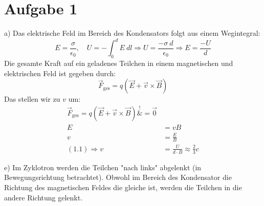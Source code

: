 \documentclass[11pt a4paper]{article}
\newcommand{\epsz}{\epsilon_0}
\begin{document}
\thispagestyle{fancy}
\section*{Aufgabe 1}
a) Das elektrische Feld im Bereich des Kondensators folgt aus einem 
Wegintegral:
\[
	E = \frac{\sigma}{\epsz}, \quad U = - \int_0^d E \ dl
	\Rightarrow
	U = \frac{-\sigma \ d}{\epsz} \Rightarrow
	E = \frac{-U}{d} \tag{1.1}
\]
Die gesamte Kraft auf ein geladenes Teilchen in einem magnetischen 
und elektrischen Feld ist gegeben durch:
\[ \vec F_\text{ges} = q (\vec E + \vec v \times \vec B) \]
Das stellen wir zu $v$ um:
\begin{align*}
	\vec F_\text{ges} = q (\vec E + \vec v \times \vec B) 
	\overset{!}&{=} \vec 0 \\
	E &= vB \\
	v &= \frac{E}{B} \\
	(1.1) \Rightarrow v &= \frac{U}{d \cdot B} 
	\approx \frac23 c
\end{align*}

\vspace{0.5cm}
e) Im Zyklotron werden die Teilchen "nach links" abgelenkt (in 
Bewegungsrichtung betrachtet). Obwohl im Bereich des Kondensator die 
Richtung des magnetischen Feldes die gleiche ist, werden die Teilchen in 
die andere Richtung gelenkt.

\newpage
\setlength{\headheight}{0cm}
\end{document}
